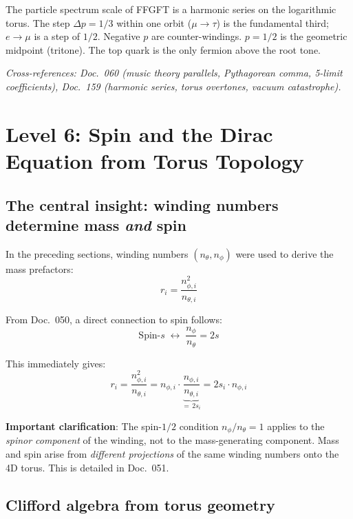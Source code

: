 \begin{predbox}
The particle spectrum scale of FFGFT is a harmonic series on the
logarithmic torus. The step $\Delta p = 1/3$ within one orbit ($\mu\to\tau$) is the
fundamental third; $e\to\mu$ is a step of $1/2$.
Negative $p$ are counter-windings. $p = 1/2$ is the geometric midpoint
(tritone). The top quark is the only fermion above the root tone.
\end{predbox}

\noindent\textit{Cross-references: Doc.~060 (music theory parallels,
Pythagorean comma, 5-limit coefficients),
Doc.~159 (harmonic series, torus overtones, vacuum catastrophe).}

\section{Level 6: Spin and the Dirac Equation from Torus Topology}

\subsection{The central insight: winding numbers determine mass \emph{and} spin}

In the preceding sections, winding numbers $(n_\theta, n_\phi)$ were
used to derive the mass prefactors:
\begin{equation}
    r_i = \frac{n_{\phi,i}^2}{n_{\theta,i}}
\end{equation}

From Doc.~050, a direct connection to spin follows:
\begin{equation}
    \text{Spin-}s \;\longleftrightarrow\; \frac{n_\phi}{n_\theta} = 2s
\end{equation}

This immediately gives:
\begin{equation}
    \boxed{r_i = \frac{n_{\phi,i}^2}{n_{\theta,i}}
    = n_{\phi,i} \cdot \underbrace{\frac{n_{\phi,i}}{n_{\theta,i}}}_{=\,2s_i}
    = 2 s_i \cdot n_{\phi,i}}
\end{equation}

\textbf{Important clarification}: The spin-$1/2$ condition
$n_\phi/n_\theta = 1$ applies to the \emph{spinor component} of the
winding, not to the mass-generating component. Mass and spin arise
from \emph{different projections} of the same winding numbers onto
the 4D torus. This is detailed in Doc.~051.

\subsection{Clifford algebra from torus geometry}

